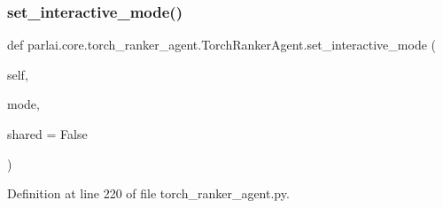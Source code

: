\subsubsection{\texorpdfstring{set\+\_\+interactive\+\_\+mode()}{set\_interactive\_mode()}}
{\footnotesize\ttfamily def parlai.\+core.\+torch\+\_\+ranker\+\_\+agent.\+Torch\+Ranker\+Agent.\+set\+\_\+interactive\+\_\+mode (\begin{DoxyParamCaption}\item[{}]{self,  }\item[{}]{mode,  }\item[{}]{shared = {\ttfamily False} }\end{DoxyParamCaption})}



Definition at line 220 of file torch\+\_\+ranker\+\_\+agent.\+py.



